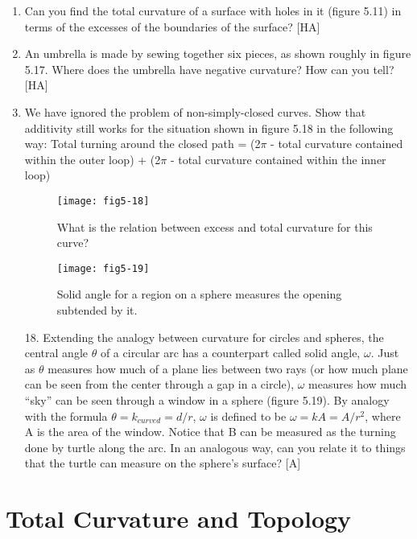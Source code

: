 \documentclass{book}
\begin{document}
\begin{enumerate}
\item Can you find the total curvature of a surface with holes in it (figure
5.11) in terms of the excesses of the boundaries of the surface? [HA]

\item An umbrella is made by sewing together six pieces, as shown roughly
in figure 5.17. Where does the umbrella have negative curvature? How
can you tell? [HA]

\item We have ignored the problem of non-simply-closed curves. Show
that additivity still works for the situation shown in figure 5.18 in the
following way:
Total turning around the closed path
= (2$\pi$ - total curvature contained within the outer loop)
+ (2$\pi$ - total curvature contained within the inner loop)

\begin{figure}
\begin{center}
\texttt{[image: fig5-18]}
\caption{What is the relation between excess and total curvature for this curve?}
\end{center}
\end{figure}

\begin{figure}
\begin{center}
\texttt{[image: fig5-19]}
\caption{Solid angle for a region on a sphere measures the opening subtended by it.}
\end{center}
\end{figure}


18. Extending the analogy between curvature for circles and spheres,
the central angle $\theta$ of a circular arc has a counterpart called solid angle,
$\omega$. Just as $\theta$ measures how much of a plane lies between two rays
(or how much plane can be seen from the center through a gap in a
circle), $\omega$ measures how much ``sky'' can be seen through a window in a
sphere (figure 5.19). By analogy with the formula $\theta = k_{curved} = d/r$,
$\omega$ is defined to be $\omega = kA = A/r^2$, where A is the area of the window.
Notice that B can be measured as the turning done by turtle along the
arc. In an analogous way, can you relate it to things that the turtle can
measure on the sphere's surface? [A]
\end{enumerate}

\section{Total Curvature and Topology}
\end{document}
